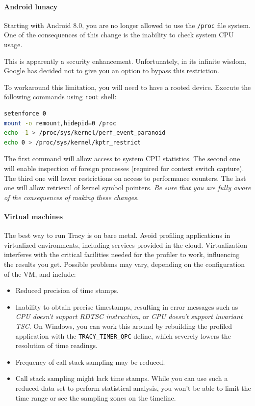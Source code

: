 \documentclass[hidelinks,titlepage,a4paper]{article}
\begin{document}
\paragraph{Android lunacy}
\label{androidlunacy}

Starting with Android 8.0, you are no longer allowed to use the \texttt{/proc} file system. One of the consequences of this change is the inability to check system CPU usage.

This is apparently a security enhancement. Unfortunately, in its infinite wisdom, Google has decided not to give you an option to bypass this restriction.

To workaround this limitation, you will need to have a rooted device. Execute the following commands using \texttt{root} shell:

\begin{lstlisting}[language=sh]
setenforce 0
mount -o remount,hidepid=0 /proc
echo -1 > /proc/sys/kernel/perf_event_paranoid
echo 0 > /proc/sys/kernel/kptr_restrict
\end{lstlisting}

The first command will allow access to system CPU statistics. The second one will enable inspection of foreign processes (required for context switch capture). The third one will lower restrictions on access to performance counters. The last one will allow retrieval of kernel symbol pointers. \emph{Be sure that you are fully aware of the consequences of making these changes.}

\paragraph{Virtual machines}

The best way to run Tracy is on bare metal. Avoid profiling applications in virtualized environments, including services provided in the cloud. Virtualization interferes with the critical facilities needed for the profiler to work, influencing the results you get. Possible problems may vary, depending on the configuration of the VM, and include:

\begin{itemize}
\item Reduced precision of time stamps.
\item Inability to obtain precise timestamps, resulting in error messages such as \emph{CPU doesn't support RDTSC instruction}, or \emph{CPU doesn't support invariant TSC}. On Windows, you can work this around by rebuilding the profiled application with the \texttt{TRACY\_TIMER\_QPC} define, which severely lowers the resolution of time readings.
\item Frequency of call stack sampling may be reduced.
\item Call stack sampling might lack time stamps. While you can use such a reduced data set to perform statistical analysis, you won't be able to limit the time range or see the sampling zones on the timeline.
\end{itemize}
\end{document}
